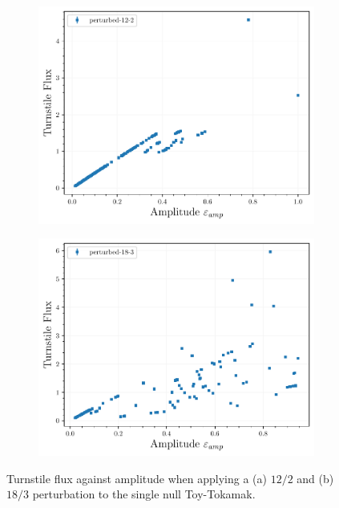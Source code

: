 \begin{figure}[H]
    \centering
    \begin{subfigure}{0.49\textwidth}
        \centering
        \includegraphics[width=\textwidth]{images/amplitudescan/turnstile_area_12_2.pdf}
        \caption{}
        \label{fig:scan-12-2}
    \end{subfigure}
    \begin{subfigure}{0.49\textwidth}
        \centering
        \includegraphics[width=\textwidth]{images/amplitudescan/turnstile_area_18_3.pdf}
        \caption{}
        \label{fig:scan-18-3}
    \end{subfigure}
    \caption{Turnstile flux against amplitude when applying a (a) $12/2$ and (b) $18/3$ perturbation to the single null Toy-Tokamak.}
    \label{fig:amp-scan}
\end{figure}


